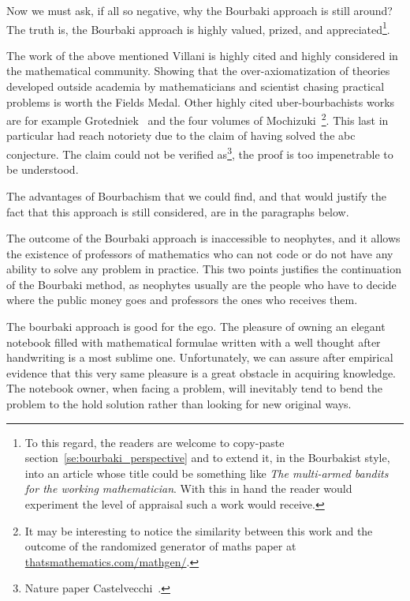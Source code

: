 \documentclass[]{scrartcl}
\theoremstyle{definition}
\begin{document}
Now we must ask, if all so negative, why the Bourbaki approach is still around? The truth is, the Bourbaki approach is highly valued, prized, and appreciated\footnote{
    To this regard, the readers are welcome to copy-paste section~\ref{se:bourbaki_perspective} and to extend it, in the Bourbakist style, into an article whose title could be something like \emph{The multi-armed bandits for the working mathematician}. With this in hand the reader would experiment the level of appraisal such a work would receive.
}.

The work of the above mentioned Villani is highly cited and highly considered in the mathematical community. 
Showing that the over-axiomatization of theories developed outside academia by mathematicians and scientist chasing practical problems is worth the Fields Medal.
Other highly cited uber-bourbachists works are for example Grotedniek~\cite{grothendieck2011some} and the four volumes of Mochizuki~\cite{mochizuki2012inter}\footnote{
    It may be interesting to notice the similarity between this work and the outcome of the randomized generator of maths paper at \href{https://thatsmathematics.com/mathgen/}{thatsmathematics.com/mathgen/}.
}. This last in particular had reach notoriety due to the claim of having solved the abc conjecture. The claim could not be verified as\footnote{Nature paper Castelvecchi~\cite{castelvecchi2015biggest}.}, the proof is too impenetrable to be understood.

The advantages of Bourbachism that we could find, and that would justify the fact that this approach is still considered, are in the paragraphs below.

The outcome of the Bourbaki approach is inaccessible to neophytes, and it allows the existence of professors of mathematics who can not code or do not have any ability to solve any problem in practice. This two points justifies the continuation of the Bourbaki method, as neophytes usually are the people who have to decide where the public money goes and professors the ones who receives them.

The bourbaki approach is good for the ego. The pleasure of owning an elegant notebook filled with mathematical formulae written with a well thought after handwriting is a most sublime one. Unfortunately, we can assure after empirical evidence that this very same pleasure is a great obstacle in acquiring knowledge. The notebook owner, when facing a problem, will inevitably tend to bend the problem to the hold solution rather than looking for new original ways.
\end{document}
